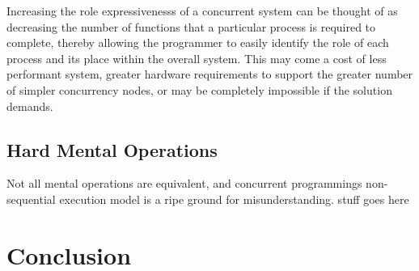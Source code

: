 \documentclass{sig-alternate}
\begin{document}
Increasing the role expressivenesss of a concurrent system can be thought of as decreasing the number of functions that a particular process is required to complete, thereby allowing the programmer to easily identify the role of each process and its place within the overall system. This may come a cost of less performant system, greater hardware requirements to support the greater number of simpler concurrency nodes, or may be completely impossible if the solution demands. 

\subsection{Hard Mental Operations}
Not all mental operations are equivalent, and concurrent programmings non-sequential execution model is a ripe ground for misunderstanding. stuff goes here

\section{Conclusion}





\end{document}

